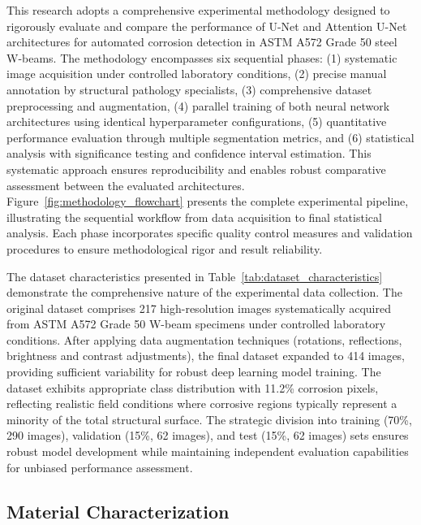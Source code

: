 \documentclass[Journal,letterpaper]{ascelike-new}
\begin{document}
This research adopts a comprehensive experimental methodology designed to rigorously evaluate and compare the performance of U-Net and Attention U-Net architectures for automated corrosion detection in ASTM A572 Grade 50 steel W-beams. The methodology encompasses six sequential phases: (1) systematic image acquisition under controlled laboratory conditions, (2) precise manual annotation by structural pathology specialists, (3) comprehensive dataset preprocessing and augmentation, (4) parallel training of both neural network architectures using identical hyperparameter configurations, (5) quantitative performance evaluation through multiple segmentation metrics, and (6) statistical analysis with significance testing and confidence interval estimation. This systematic approach ensures reproducibility and enables robust comparative assessment between the evaluated architectures. Figure~\ref{fig:methodology_flowchart} presents the complete experimental pipeline, illustrating the sequential workflow from data acquisition to final statistical analysis. Each phase incorporates specific quality control measures and validation procedures to ensure methodological rigor and result reliability.

The dataset characteristics presented in Table~\ref{tab:dataset_characteristics} demonstrate the comprehensive nature of the experimental data collection. The original dataset comprises 217 high-resolution images systematically acquired from ASTM A572 Grade 50 W-beam specimens under controlled laboratory conditions. After applying data augmentation techniques (rotations, reflections, brightness and contrast adjustments), the final dataset expanded to 414 images, providing sufficient variability for robust deep learning model training. The dataset exhibits appropriate class distribution with 11.2\% corrosion pixels, reflecting realistic field conditions where corrosive regions typically represent a minority of the total structural surface. The strategic division into training (70\%, 290 images), validation (15\%, 62 images), and test (15\%, 62 images) sets ensures robust model development while maintaining independent evaluation capabilities for unbiased performance assessment.

\subsection{Material Characterization}
\label{subsec:material_characterization}
\end{document}
